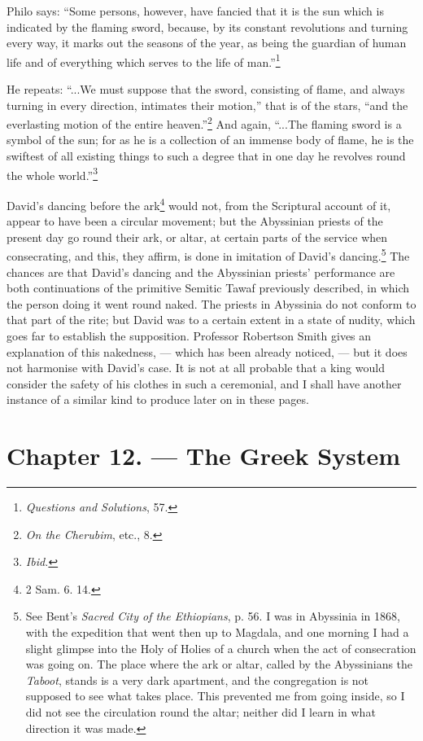 \documentclass[a4paper, 11pt, oneside, polutonikogreek, english]{article}
\begin{document}
Philo says: ``Some persons, however, have fancied that it is the sun which is indicated by the flaming sword, because, by its constant revolutions and turning every way, it marks out the seasons of the year, as being the guardian of human life and of everything which serves to the life of man.''\footnote{\emph{Questions and Solutions}, 57.}

He repeats: ``...We must suppose that the sword, consisting of flame, and always turning in every direction, intimates their motion,'' that is of the stars, ``and the everlasting motion of the entire heaven.''\footnote{\emph{On the Cherubim}, etc., 8.} And again, ``...The flaming sword is a symbol of the sun; for as he is a collection of an immense body of flame, he is the swiftest of all existing things to such a degree that in one day he revolves round the whole world.''\footnote{\emph{Ibid.}}

David's dancing before the ark\footnote{2 Sam. 6. 14.} would not, from the Scriptural account of it, appear to have been a circular movement; but the Abyssinian priests of the present day go round their ark, or altar, at certain parts of the service when consecrating, and this, they affirm, is done in imitation of David's dancing.\footnote{See Bent's \emph{Sacred City of the Ethiopians}, p. 56. I was in Abyssinia in 1868, with the expedition that went then up to Magdala, and one morning I had a slight glimpse into the Holy of Holies of a church when the act of consecration was going on. The place where the ark or altar, called by the Abyssinians the \emph{Taboot}, stands is a very dark apartment, and the congregation is not supposed to see what takes place. This prevented me from going inside, so I did not see the circulation round the altar; neither did I learn in what direction it was made.} The chances are that David's dancing and the Abyssinian priests' performance are both continuations of the primitive Semitic Tawaf previously described, in which the person doing it went round naked. The priests in Abyssinia do not conform to that part of the rite; but David was to a certain extent in a state of nudity, which goes far to establish the supposition. Professor Robertson Smith gives an explanation of this nakedness, --- which has been already noticed, --- but it does not harmonise with David's case. It is not at all probable that a king would consider the safety of his clothes in such a ceremonial, and I shall have another instance of a similar kind to produce later on in these pages.
\clearpage
\section{Chapter 12. --- The Greek System}
\end{document}
